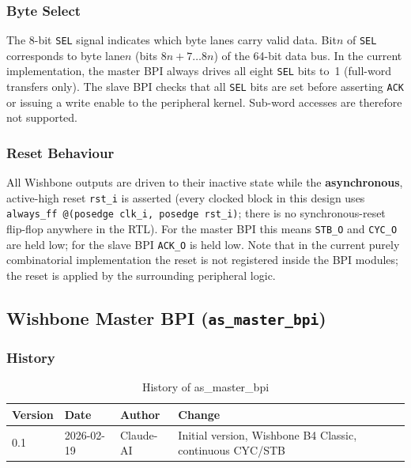 \subsubsection{Byte Select}

The 8-bit \texttt{SEL} signal indicates which byte lanes carry valid data.
Bit\;$n$ of \texttt{SEL} corresponds to byte lane\;$n$ (bits $8n+7\ldots 8n$)
of the 64-bit data bus.
In the current implementation, the master BPI always drives all eight
\texttt{SEL} bits to~1 (full-word transfers only).
The slave BPI checks that all \texttt{SEL} bits are set before asserting
\texttt{ACK} or issuing a write enable to the peripheral kernel.
Sub-word accesses are therefore not supported.

\subsubsection{Reset Behaviour}
\label{subsubsec:wbResetBehaviour}

All Wishbone outputs are driven to their inactive state while the
\textbf{asynchronous}, active-high reset \texttt{rst\_i} is asserted (every
clocked block in this design uses
\texttt{always\_ff\ @(posedge\ clk\_i,\ posedge\ rst\_i)}; there is no
synchronous-reset flip-flop anywhere in the RTL).
For the master BPI this means \texttt{STB\_O} and \texttt{CYC\_O} are held
low; for the slave BPI \texttt{ACK\_O} is held low.
Note that in the current purely combinatorial implementation the reset
is not registered inside the BPI modules; the reset is applied by the
surrounding peripheral logic.



\subsection{Wishbone Master BPI (\texttt{as\_master\_bpi})}
\label{subsec:asMasterBpi}

\subsubsection{History}
\begin{table}[H]
\caption{History of as\_master\_bpi}
\label{tab:asMasterBpiHist}
\centering
\begin{tabularx}{\textwidth}{|l |l |l |X|}
  \hline
  Version & Date & Author & Change \\
  \hline
  \hline
  0.1 & 2026-02-19 & Claude-AI & Initial version, Wishbone B4 Classic, continuous CYC/STB \\
  \hline
\end{tabularx}
\end{table}

